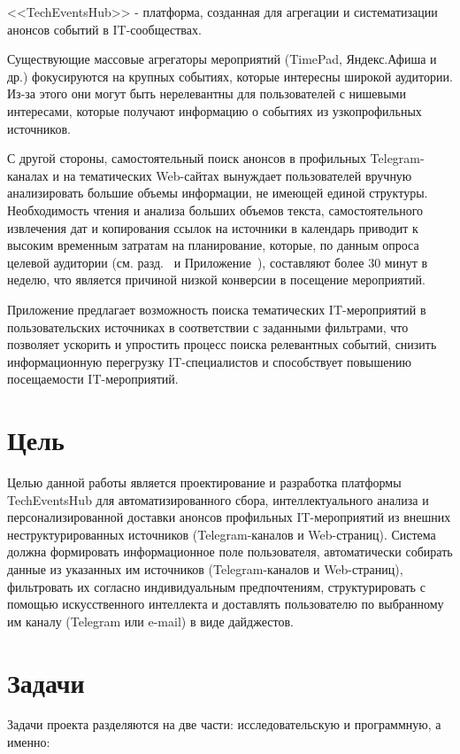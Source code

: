 <<TechEventsHub>> - платформа, созданная для агрегации и систематизации анонсов событий в IT-сообществах.

Существующие массовые агрегаторы мероприятий (TimePad, Яндекс.Афиша и др.) фокусируются на крупных событиях, которые интересны широкой аудитории.
Из-за этого они могут быть нерелевантны для пользователей с нишевыми интересами, которые получают информацию о событиях из узкопрофильных источников.

С другой стороны, самостоятельный поиск анонсов в профильных Telegram-каналах и на тематических Web-сайтах вынуждает пользователей вручную анализировать большие объемы информации, не имеющей единой структуры.
Необходимость чтения и анализа больших объемов текста, самостоятельного извлечения дат и копирования ссылок на источники в календарь приводит к высоким временным затратам на планирование, которые, по данным опроса целевой аудитории (см. разд.~ и Приложение~), составляют более 30 минут в неделю, что является причиной низкой конверсии в посещение мероприятий.

Приложение предлагает возможность поиска тематических IT-мероприятий в пользовательских источниках в соответствии с заданными фильтрами, что позволяет ускорить и упростить процесс поиска релевантных событий, снизить информационную перегрузку IT-специалистов и способствует повышению посещаемости IT-мероприятий. 

\section*{Цель}
Целью данной работы является проектирование и разработка платформы TechEventsHub для автоматизированного сбора, интеллектуального анализа и персонализированной доставки анонсов профильных IT-мероприятий из внешних неструктурированных источников (Telegram-каналов и Web-страниц).
Система должна формировать информационное поле пользователя, автоматически собирать данные из указанных им источников (Telegram-каналов и Web-страниц), фильтровать их согласно индивидуальным предпочтениям, структурировать с помощью искусственного интеллекта и доставлять пользователю по выбранному им каналу (Telegram или e-mail) в виде дайджестов.


\section*{Задачи}
Задачи проекта разделяются на две части: исследовательскую и программную, а именно:

